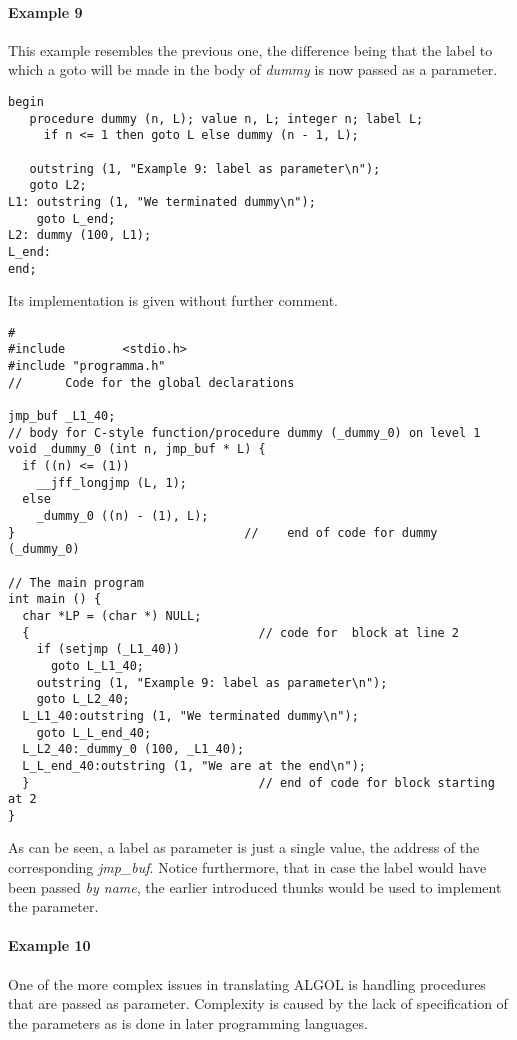 \documentclass[11pt]{article}
\begin{document}
\paragraph{Example 9}
This example resembles the previous one, the difference being that the
label to which a goto will be made in the body of {\em dummy} is now
passed as a parameter.
{\footnotesize
\begin{verbatim}
begin
   procedure dummy (n, L); value n, L; integer n; label L;
     if n <= 1 then goto L else dummy (n - 1, L);

   outstring (1, "Example 9: label as parameter\n");
   goto L2;
L1: outstring (1, "We terminated dummy\n");
    goto L_end;
L2: dummy (100, L1);
L_end:
end;
\end{verbatim}
}

Its implementation is given without further comment.
{\footnotesize
\begin{verbatim}
#
#include        <stdio.h>
#include "programma.h"
//      Code for the global declarations

jmp_buf _L1_40;
// body for C-style function/procedure dummy (_dummy_0) on level 1
void _dummy_0 (int n, jmp_buf * L) {
  if ((n) <= (1))
    __jff_longjmp (L, 1);
  else
    _dummy_0 ((n) - (1), L);
}                                //    end of code for dummy (_dummy_0)

// The main program
int main () {
  char *LP = (char *) NULL;
  {                                // code for  block at line 2 
    if (setjmp (_L1_40))
      goto L_L1_40;
    outstring (1, "Example 9: label as parameter\n");
    goto L_L2_40;
  L_L1_40:outstring (1, "We terminated dummy\n");
    goto L_L_end_40;
  L_L2_40:_dummy_0 (100, _L1_40);
  L_L_end_40:outstring (1, "We are at the end\n");
  }                                // end of code for block starting at 2
}
\end{verbatim}
}
As can be seen, a label as parameter is just a single value, the address of the
corresponding {\em jmp\_buf}. Notice furthermore, that
in case the label would have been passed {\em by name}, the earlier introduced
thunks would be used to implement the parameter.
\paragraph{Example 10}
One of the more complex issues in translating ALGOL is handling procedures
that are passed as parameter. Complexity is caused by the
lack of specification of  the parameters as is done in later
programming languages.
\end{document}
